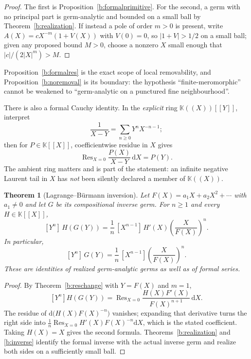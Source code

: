 \documentclass[11pt,a4paper]{article}
\numberwithin{equation}{section}
\newtheorem{theorem}{Theorem}[section]
\theoremstyle{definition}
\theoremstyle{remark}
\theoremstyle{plain}
\newcommand{\K}{\mathbb K}
\DeclareMathOperator{\Res}{Res}                 %
\newcommand{\abs}[1]{\lvert #1\rvert}
\newcommand{\dd}{\mathrm d}
\begin{document}
\begin{proof}
The first is Proposition~\ref{b:formalprimitive}. For the second, a germ
with no principal part is germ-analytic and bounded on a small ball by
Theorem~\ref{b:realization}. If instead a pole of order $m>0$ is present,
write $A(X)=cX^{-m}(1+V(X))$ with $V(0)=0$, so $\abs{1+V}>1/2$ on a small
ball; given any proposed bound $M>0$, choose a nonzero $X$ small enough
that $\abs c/(2\abs X^{m})>M$.
\end{proof}

Proposition~\ref{b:formalres} is the exact scope of local removability,
and Proposition~\ref{b:noremoval} is its boundary: the hypothesis
``finite-meromorphic'' cannot be weakened to ``germ-analytic on a punctured
fine neighbourhood''.

There is also a formal Cauchy identity. In the \emph{explicit} ring
$\K((X))[[Y]]$, interpret
\[
 \frac1{X-Y}=\sum_{n\ge0}Y^{n}X^{-n-1};
\]
then for $P\in\K[[X]]$, coefficientwise residue in $X$ gives
\begin{equation}
\label{b:eq-formalCauchy}
 \Res_{X=0}\frac{P(X)}{X-Y}\,\dd X=P(Y).
\end{equation}
The ambient ring matters and is part of the statement: an infinite
negative Laurent tail in $X$ has \emph{not} been silently declared a
member of $\K((X))$.

\begin{theorem}[Lagrange--B\"urmann inversion]
\label{b:lagrange}
Let $F(X)=a_1X+a_2X^{2}+\cdots$ with $a_1\ne0$ and let $G$ be its
compositional inverse germ. For $n\ge1$ and every $H\in\K[[X]]$,
\[
 [Y^{n}]\,H(G(Y))
 =\frac1n\,[X^{n-1}]\,H'(X)\left(\frac{X}{F(X)}\right)^{n}.
\]
In particular,
\[
 [Y^{n}]\,G(Y)=\frac1n\,[X^{n-1}]\left(\frac{X}{F(X)}\right)^{n}.
\]
These are identities of realized germ-analytic germs as well as of formal
series.
\end{theorem}

\begin{proof}
By Theorem~\ref{b:reschange} with $Y=F(X)$ and $m=1$,
\[
 [Y^{n}]H(G(Y))=\Res_{X=0}\frac{H(X)F'(X)}{F(X)^{n+1}}\,\dd X .
\]
The residue of $\dd\bigl(H(X)F(X)^{-n}\bigr)$ vanishes; expanding that
derivative turns the right side into
$\frac1n\Res_{X=0}H'(X)F(X)^{-n}\dd X$, which is the stated coefficient.
Taking $H(X)=X$ gives the second formula. Theorems~\ref{b:realization} and
\ref{b:inverse} identify the formal inverse with the actual inverse germ
and realize both sides on a sufficiently small ball.
\end{proof}
\end{document}
